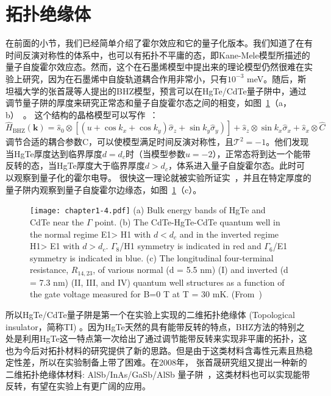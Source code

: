 \section{拓扑绝缘体}\label{sec:system}
在前面的小节，我们已经简单介绍了霍尔效应和它的量子化版本。我们知道了在有时间反演对称性的体系中，也可以有拓扑不平庸的态，即Kane-Mele模型所描述的量子自旋霍尔效应态。然而，这个在石墨烯模型中提出来的理论模型仍然很难在实验上研究，因为在石墨烯中自旋轨道耦合作用非常小，只有$10^{-3}$ meV。随后，斯坦福大学的张首晟等人提出的BHZ模型，预言可以在HgTe/CdTe量子阱中，通过调节量子阱的厚度来研究正常态和量子自旋霍尔态之间的相变，如图~\ref{fig:1-4}（a，b）~\citep{bernevig2004}。
这个结构的晶格模型可以写作~\citep{bernevig2004,Asboth2015}：
\begin{equation}
    \label{eq:1-5}
    \left.\hat{H}_{\mathrm{BHZ}}(\mathbf{k})=\hat{s}_{0} \otimes\left[\left(u+\cos k_{x}+\cos k_{y}\right) \hat{\sigma}_{z}+\sin k_{y} \hat{\sigma}_{y}\right)\right]+\hat{s}_{z} \otimes \sin k_{x} \hat{\sigma}_{x}+\hat{s}_{x} \otimes \hat{C}
\end{equation}
调节合适的耦合参数C，可以使模型满足时间反演对称性，且$\mathcal{T}^2=-1$。他们发现当HgTe厚度达到临界厚度$d=d_c$时（当模型参数$u=-2$），正常态将到达一个能带反转的态，当HgTe厚度大于临界厚度$d>d_c$，体系进入量子自旋霍尔态。此时可以观察到量子化的霍尔电导。 很快这一理论就被实验所证实~\citep{konig2007quantum}，并且在特定厚度的量子阱内观察到量子自旋霍尔边缘态，如图~\ref{fig:1-4}（c）。
\begin{figure}[!t]
    \centering
    \texttt{[image: chapter1-4.pdf]}
    { (a) Bulk energy bands of HgTe and CdTe near the $\Gamma$ point. (b) The CdTe-HgTe-CdTe quantum well in the normal regime E1> H1 with $d < d_c$ and in the inverted regime H1> E1 with $d > d_c$. $\Gamma_8$/H1 symmetry is indicated in red and $\Gamma_6$/E1 symmetry is indicated in blue. (c) The longitudinal four-terminal resistance, $R_{14,23}$, of various normal (d = 5.5 nm) (I) and inverted (d = 7.3 nm) (II, III, and IV) quantum well structures as a function of the gate voltage measured for B=0 T at T = 30 mK. (From~\citep{bernevig2004,konig2007quantum})}
    \label{fig:1-4}
\end{figure}
所以HgTe/CdTe量子阱是第一个在实验上实现的二维拓扑绝缘体 (Topological insulator，简称TI) 。因为HgTe天然的具有能带反转的特点，BHZ方法的特别之处是利用HgTe这一特点第一次给出了通过调节能带反转来实现非平庸的拓扑，这也为今后对拓扑材料的研究提供了新的思路。但是由于这类材料含毒性元素且热稳定性差，所以在实验制备上带了困难。在2008年， 张首晟研究组又提出一种新的二维拓扑绝缘体材料: AlSb/InAs/GaSb/AlSb 量子阱~\citep{zhang2008,InAs}，这类材料也可以实现能带反转，有望在实验上有更广阔的应用。

